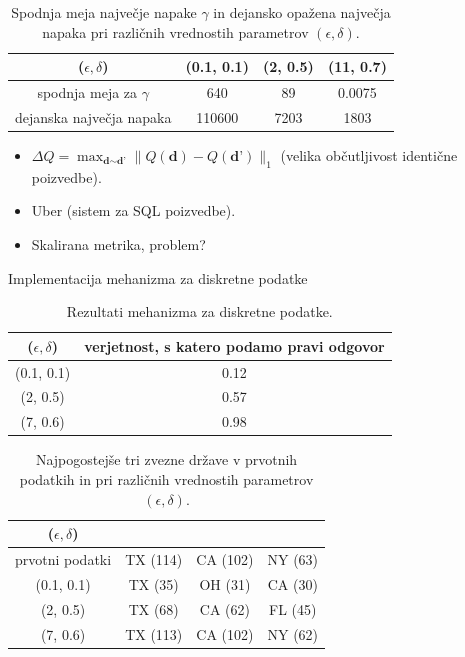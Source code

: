 \documentclass{beamer}
\begin{document}
\begin{frame}
\begin{table}[h]
\begin{center}
 \begin{tabular}{| c | c | c | c |} 
 \hline
($\epsilon, \delta$) & (0.1, 0.1) & (2, 0.5) & (11, 0.7)  \\ [0.5ex] 
 \hline
 spodnja meja za $\gamma$ & 640 & 89 & 0.0075  \\ 
 \hline
 dejanska največja napaka & 110600 & 7203 & 1803\\
 \hline
\end{tabular}
\caption{Spodnja meja največje napake $\gamma$ in dejansko opažena največja napaka pri različnih vrednostih parametrov $(\epsilon, \delta)$. }
\end{center}
\end{table}
\begin{itemize}
\item $\Delta Q = \max_{\textbf{d} \sim \textbf{d'}} \| Q(\textbf{d}) - Q(\textbf{d'}) \|_1$ (velika občutljivost identične poizvedbe).
\item Uber (sistem za SQL poizvedbe).
\item Skalirana metrika, problem?
\end{itemize}
\end{frame}
\begin{frame}{Implementacija mehanizma za diskretne podatke}
\begin{table}[!htb]
\begin{center}
 \begin{tabular}{| c | c | } 
 \hline
($\epsilon, \delta$) & verjetnost, s katero podamo pravi odgovor  \\ [0.5ex] 
 \hline
(0.1, 0.1) & 0.12  \\ 
 \hline
 (2, 0.5) & 0.57  \\ 
 \hline
 (7, 0.6) & 0.98  \\ 
 \hline
\end{tabular}
\caption{Rezultati mehanizma za diskretne podatke. }
\end{center}
\end{table}
\begin{table}[!htb]
\begin{center}
 \begin{tabular}{| c | c | c | c|} 
 \hline
($\epsilon, \delta$) & & &  \\ [0.5ex] 
 \hline
prvotni podatki & TX (114) & CA (102) & NY (63)  \\ 
 \hline
(0.1, 0.1) & TX (35) & OH (31) & CA (30)  \\ 
 \hline
(2, 0.5) & TX (68) & CA (62) & FL (45)  \\ 
 \hline
(7, 0.6) & TX (113) & CA (102) & NY (62)  \\ 
 \hline
\end{tabular}
\caption{Najpogostejše tri zvezne države v prvotnih podatkih in pri različnih vrednostih parametrov $(\epsilon, \delta)$. }
\end{center}
\end{table}
\end{frame}
\end{document}
